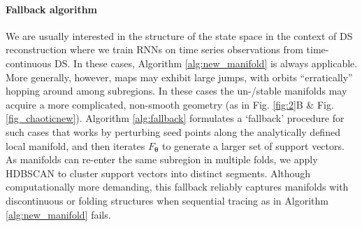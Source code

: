 \documentclass{article}
\theoremstyle{example}
\theoremstyle{plain}
\theoremstyle{definition}
\theoremstyle{remark}
\begin{document}
\paragraph{Fallback algorithm}
We are usually interested in the structure of the state space in the context of DS reconstruction where we train RNNs on time series observations from time-continuous DS. In these cases, Algorithm \ref{alg:new_manifold} is always applicable. More generally, however, maps may exhibit large jumps, with orbits ``erratically'' hopping around among subregions. In these cases the un-/stable manifolds may acquire a more complicated, non-smooth geometry (as in Fig. \ref{fig:2}B \& Fig. \ref{fig_chaoticnew}). 
Algorithm \ref{alg:fallback} formulates a `fallback' procedure for such cases that works by perturbing 
seed points along the analytically defined local manifold, and then iterates $F_{\mathbf{\theta}}$ to generate a larger set of support vectors. As manifolds can re-enter the same subregion in multiple folds, we apply HDBSCAN \citep{McInnes2017,ester1996density} to cluster support vectors into distinct segments. Although computationally more demanding, this fallback reliably captures manifolds with discontinuous or folding structures when sequential tracing as in Algorithm \ref{alg:new_manifold} fails.
\color{black}
\end{document}

